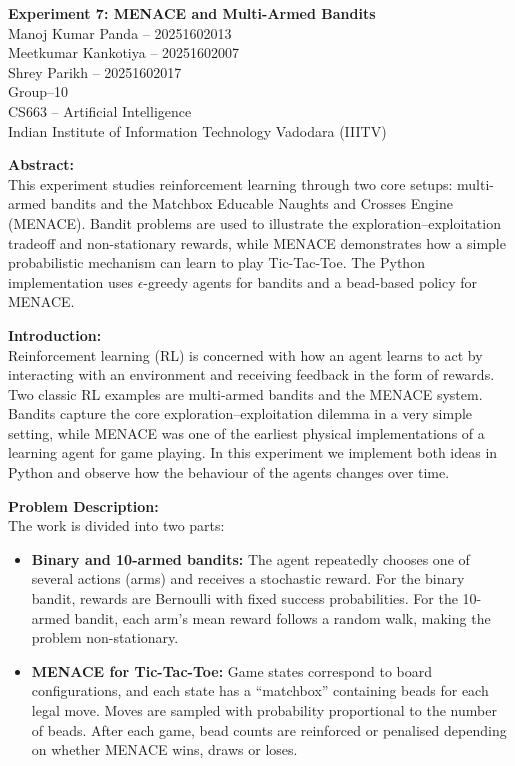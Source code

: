 \documentclass[14pt]{extreport}
\begin{document}
\begin{center}
\textbf{Experiment 7: MENACE and Multi-Armed Bandits}\\[0.8em]
Manoj Kumar Panda -- 20251602013\\
Meetkumar Kankotiya -- 20251602007\\
Shrey Parikh -- 20251602017\\[0.5em]
Group--10\\
CS663 -- Artificial Intelligence\\
Indian Institute of Information Technology Vadodara (IIITV)
\end{center}

\vspace{1em}

\noindent\textbf{Abstract:}\\
This experiment studies reinforcement learning through two core setups:
multi-armed bandits and the Matchbox Educable Naughts and Crosses Engine
(MENACE). Bandit problems are used to illustrate the exploration--exploitation
tradeoff and non-stationary rewards, while MENACE demonstrates how a simple
probabilistic mechanism can learn to play Tic-Tac-Toe. The Python
implementation uses $\epsilon$-greedy agents for bandits and a bead-based
policy for MENACE.

\vspace{1em}

\noindent\textbf{Introduction:}\\
Reinforcement learning (RL) is concerned with how an agent learns to act by
interacting with an environment and receiving feedback in the form of rewards.
Two classic RL examples are multi-armed bandits and the MENACE system. Bandits
capture the core exploration--exploitation dilemma in a very simple setting,
while MENACE was one of the earliest physical implementations of a learning
agent for game playing. In this experiment we implement both ideas in Python
and observe how the behaviour of the agents changes over time.

\vspace{1em}

\noindent\textbf{Problem Description:}\\
The work is divided into two parts:
\begin{itemize}
  \item \textbf{Binary and 10-armed bandits:} The agent repeatedly chooses one
  of several actions (arms) and receives a stochastic reward. For the binary
  bandit, rewards are Bernoulli with fixed success probabilities. For the
  10-armed bandit, each arm's mean reward follows a random walk, making the
  problem non-stationary.
  \item \textbf{MENACE for Tic-Tac-Toe:} Game states correspond to board
  configurations, and each state has a ``matchbox'' containing beads for each
  legal move. Moves are sampled with probability proportional to the number of
  beads. After each game, bead counts are reinforced or penalised depending on
  whether MENACE wins, draws or loses.
\end{itemize}
\end{document}
